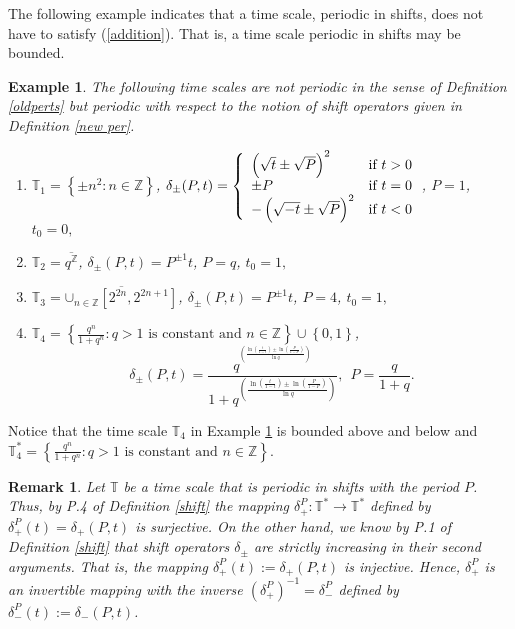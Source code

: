\documentclass[b5paper,reqno]{amsart}\usepackage{amsfonts}
\theoremstyle{plain}
\newtheorem{example}{Example}
\newtheorem{remark}{Remark}
\numberwithin{equation}{section}
\begin{document}
The following example indicates that a time scale, periodic in shifts, does
not have to satisfy (\ref{addition}). That is, a time scale periodic in shifts
may be bounded.

\begin{example}
\label{ex new per}The following time scales are not periodic in the sense of
Definition \ref{oldperts} but periodic with respect to the notion of shift
operators given in Definition \ref{new per}.

\begin{enumerate}
\item $\mathbb{T}_{1}\mathbb{=}\left\{  \pm n^{2}:n\in\mathbb{Z}\right\}  $,
$\delta_{\pm}(P,t)=\left\{
\begin{array}
[c]{ll}\left(  \sqrt{t}\pm\sqrt{P}\right)  ^{2} & \text{if }t>0\\
\pm P & \text{if }t=0\\
-\left(  \sqrt{-t}\pm\sqrt{P}\right)  ^{2} & \text{if }t<0
\end{array}
\right.  $, $P=1$, $t_{0}=0,$

\item $\mathbb{T}_{2}\mathbb{=}\overline{q^{\mathbb{Z}}}$, $\delta_{\pm
}(P,t)=P^{\pm1}t$, $P=q$, $t_{0}=1,$

\item $\mathbb{T}_{3}\mathbb{=}\overline{\mathbb{\cup}_{n\in\mathbb{Z}}\left[
2^{2n},2^{2n+1}\right]  }$, $\delta_{\pm}(P,t)=P^{\pm1}t$, $P=4$, $t_{0}=1,$

\item $\mathbb{T}_{4}\mathbb{=}\left\{  \frac{q^{n}}{1+q^{n}}:q>1\text{ is
constant and }n\in\mathbb{Z}\right\}  \cup\left\{  0,1\right\}  $,
\[
\delta_{\pm}(P,t)=\dfrac{q^{^{\left(  \frac{\ln\left(  \frac{t}{1-t}\right)
\pm\ln\left(  \frac{P}{1-P}\right)  }{\ln q}\right)  }}}{1+q^{\left(
\frac{\ln\left(  \frac{t}{1-t}\right)  \pm\ln\left(  \frac{P}{1-P}\right)
}{\ln q}\right)  }},\ \ P=\frac{q}{1+q}.
\]

\end{enumerate}
\end{example}

Notice that the time scale $\mathbb{T}_{4}$ in Example \ref{ex new per} is
bounded above and below and $\mathbb{T}_{4}^{\ast}=\left\{  \frac{q^{n}}{1+q^{n}}:q>1\text{ is constant and }n\in\mathbb{Z}\right\}  $.

\begin{remark}
Let $\mathbb{T}$ be a time scale that is periodic in shifts with the period
$P$. Thus, by P.4 of Definition \ref{shift} the mapping $\delta_{+}^{P}:\mathbb{T}^{\ast}\rightarrow\mathbb{T}^{\ast}$ defined by $\delta_{+}^{P}(t)=\delta_{+}(P,t)$ is surjective. On the other hand, we know by P.1 of
Definition \ref{shift} that shift operators $\delta_{\pm}$ are strictly
increasing in their second arguments. That is, the mapping $\delta_{+}^{P}(t):=\delta_{+}(P,t)$ is injective. Hence, $\delta_{+}^{P}$ is an
invertible mapping with the inverse $\left(  \delta_{+}^{P}\right)
^{-1}=\delta_{-}^{P}$ defined by $\delta_{-}^{P}(t):=\delta_{-}(P,t)$.
\end{remark}
\end{document}
